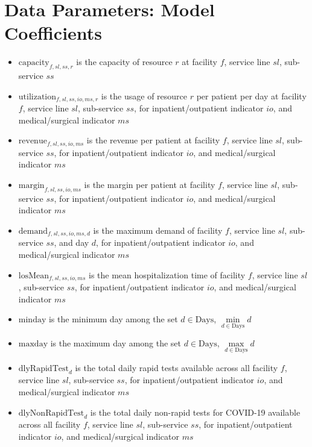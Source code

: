 \documentclass[10pt, letterpaper]{article}
\begin{document}
\section*{Data Parameters: Model Coefficients}
\begin{itemize}
\item[ ] $\text{capacity}_{f,sl,ss,r}$  is the capacity of resource $r$ at facility $f$, service line $sl$, sub-service $ss$
\item[ ] $\text{utilization}_{f,sl,ss,io,ms,r}$ is the usage of resource $r$ per patient per day at facility $f$, service line $sl$, sub-service $ss$, for inpatient/outpatient indicator $io$, and medical/surgical indicator $ms$
\item[ ] $\text{revenue}_{f,sl,ss,io,ms}$  is the revenue per patient at facility $f$, service line $sl$, sub-service $ss$, for inpatient/outpatient indicator $io$, and medical/surgical indicator $ms$
\item[ ] $\text{margin}_{f,sl,ss,io,ms}$  is the margin per patient at facility $f$, service line $sl$, sub-service $ss$, for inpatient/outpatient indicator $io$, and medical/surgical indicator $ms$
\item[ ] $\text{demand}_{f,sl,ss,io,ms,d}$ is the maximum demand of facility $f$, service line $sl$, sub-service $ss$, and day $d$, for inpatient/outpatient indicator $io$, and medical/surgical indicator $ms$
\item[ ] $\text{losMean}_{f,sl,ss,io,ms}$  is the mean hospitalization time of facility $f$, service line $sl$, sub-service $ss$, for inpatient/outpatient indicator $io$, and medical/surgical indicator $ms$
\item[ ] $\text{minday}$ is the minimum day among the set $ d \in \text{Days}$, ${\min\limits_{d \in \text{Days}} d}$
\item[ ] $\text{maxday}$ is the maximum day among the set $ d \in \text{Days}$, ${\max\limits_{d \in \text{Days}} d}$
\item[ ] $\text{dlyRapidTest}_{d}$ is the total daily rapid tests available across all facility $f$, service line $sl$, sub-service $ss$, for inpatient/outpatient indicator $io$, and medical/surgical indicator $ms$ 
\item[ ] $\text{dlyNonRapidTest}_{d}$ is the total daily non-rapid tests for COVID-19 available across all facility $f$, service line $sl$, sub-service $ss$, for inpatient/outpatient indicator $io$, and medical/surgical indicator $ms$ 

\pagebreak


\end{itemize}
\end{document}
